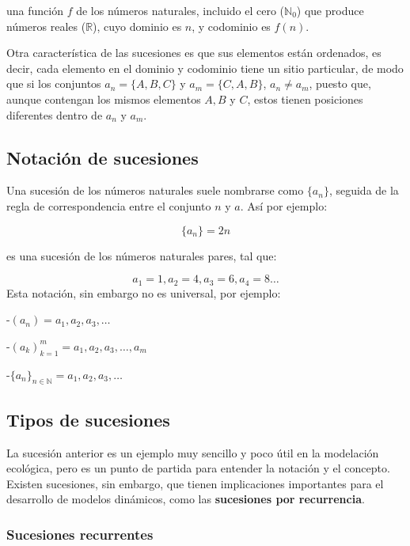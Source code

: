 \documentclass[
]{book}
\begin{document}
una función \(f\) de los números naturales, incluido el cero (\(\mathbb{N}_0\)) que produce números reales (\(\mathbb{R}\)), cuyo dominio es \(n\), y codominio es \(f(n)\).

Otra característica de las sucesiones es que sus elementos están ordenados, es decir, cada elemento en el dominio y codominio tiene un sitio particular, de modo que si los conjuntos \(a_n = \{A, B, C\}\) y \(a_m = \{C, A, B\}\), \(a_n \neq a_m\), puesto que, aunque contengan los mismos elementos \(A, B\) y \(C\), estos tienen posiciones diferentes dentro de \(a_n\) y \(a_m\).

\hypertarget{notaciuxf3n-de-sucesiones}{%
\subsection{Notación de sucesiones}\label{notaciuxf3n-de-sucesiones}}

Una sucesión de los números naturales suele nombrarse como \(\{a_n\}\), seguida de la regla de correspondencia entre el conjunto \(n\) y \(a\). Así por ejemplo:

\begin{equation} 
    \{a_n\} = 2n \label{eq:a2n}
\end{equation}

es una sucesión de los números naturales pares, tal que:

\[a_1 = 1, a_2 = 4, a_3 = 6, a_4 = 8 \dots\]
Esta notación, sin embargo no es universal, por ejemplo:

-\((a_n) = a_1, a_2, a_3, \dots\)

-\((a_k)_{k=1}^m = a_1, a_2, a_3, \dots, a_m\)

-\(\{a_n\}_{n \in \mathbb{N}} = a_1, a_2, a_3, \dots\)

\hypertarget{tipos-de-sucesiones}{%
\subsection{Tipos de sucesiones}\label{tipos-de-sucesiones}}

La sucesión anterior es un ejemplo muy sencillo y poco útil en la modelación ecológica, pero es un punto de partida para entender la notación y el concepto. Existen sucesiones, sin embargo, que tienen implicaciones importantes para el desarrollo de modelos dinámicos, como las \textbf{sucesiones por recurrencia}.

\hypertarget{sucesiones-recurrentes}{%
\subsubsection{Sucesiones recurrentes}\label{sucesiones-recurrentes}}
\end{document}
